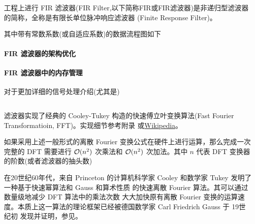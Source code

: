 \section{}

\subsection{}

工程上进行
FIR 滤波器(FIR Filter,以下简称FIR或FIR滤波器)是非递归型滤波器的简称，全称是有限长单位脉冲响应滤波器
(Finite Response Filter)。

其中带有常数系数(或自适应系数)的数据流程图如下

\paragraph{FIR 滤波器的架构优化}

\paragraph{FIR 滤波器中的内存管理}


对于更加详细的信号处理介绍(尤其是)

\subsection{}

滤波器实现了经典的 Cooley-Tukey 构造的快速傅立叶变换算法(Fast Fourier Transformatioin, FFT)。实现细节参考附录
或\href{https://en.wikipedia.org/wiki/Cooley–Tukey_FFT_algorithm}{Wikipedia}。

如果采用上述一般形式的离散 Fourier 变换公式在硬件上进行运算，那么完成一次完整的 DFT 需要进行
$\mathcal{O} (n^2)$ 次乘法和 $\mathcal{O}(n^2)$ 次加法。其中 $n$ 代表 DFT 变换器的阶数(或者滤波器的抽头数)

在20世纪60年代，来自 Princeton 的计算机科学家 Cooley 和数学家 Tukey 发明了一种基于快速幂算法和 Gauss 和算术性质
的快速离散 Fourier 算法。其可以通过数量级地减少 DFT 算法中的乘法次数
大大加快原有离散 Fourier 变换的运算速度。本质上这一算法的理论框架已经被德国数学家 Carl Friedrich Gauss 于 19世纪初
发现并证明，参见。

\subsection{}

